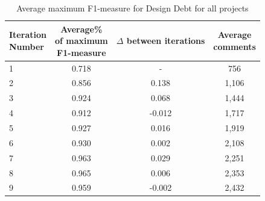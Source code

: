 
\begin{table}[!thb]
    \begin{center}
        \caption{Average maximum F1-measure for Design Debt  for all projects}
        \label{tbl:design_iteration_performance}
        \begin{tabular}{l| c c c}
        \toprule
        \thead{Iteration\\Number} & \thead{Average\%\\of maximum\\F1-measure} & \thead{$\Delta$\\between\\iterations} & \thead{Average\\comments} \\
        \midrule
         1  &  0.718 &  -      & 756   \\  
         2  &  0.856 & 0.138   & 1,106 \\  
         3  &  0.924 & 0.068   & 1,444 \\  
         4  &  0.912 & -0.012  & 1,717 \\  
         5  &  0.927 & 0.016   & 1,919 \\  
         6  &  0.930 & 0.002   & 2,108 \\  
         7  &  0.963 & 0.029   & 2,251 \\  
         8  &  0.965 & 0.006   & 2,353 \\  
         9  &  0.959 & -0.002  & 2,432 \\  
        \bottomrule
        \end{tabular}
    \end{center}    
\end{table}

